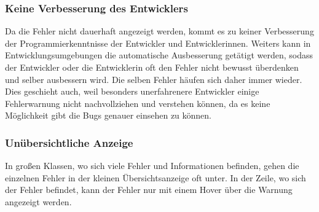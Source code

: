 \subsubsection{Keine Verbesserung des Entwicklers} 
Da die Fehler nicht dauerhaft angezeigt werden, kommt es zu keiner Verbesserung der Programmierkenntnisse der Entwickler und Entwicklerinnen. Weiters kann in Entwicklungsumgebungen die automatische Ausbesserung getätigt werden, sodass der Entwickler oder die Entwicklerin oft den Fehler nicht bewusst überdenken und selber ausbessern wird. 
Die selben Fehler häufen sich daher immer wieder. Dies geschieht auch, weil besonders unerfahrenere Entwickler einige Fehlerwarnung nicht nachvollziehen und verstehen können, da es keine Möglichkeit gibt die Bugs genauer einsehen zu können. 

\subsubsection{Unübersichtliche Anzeige} 
In großen Klassen, wo sich viele Fehler und Informationen befinden, gehen die einzelnen Fehler in der kleinen Übersichtsanzeige oft unter. In der Zeile, wo sich der Fehler befindet, kann der Fehler nur mit einem Hover über die Warnung angezeigt werden. 
